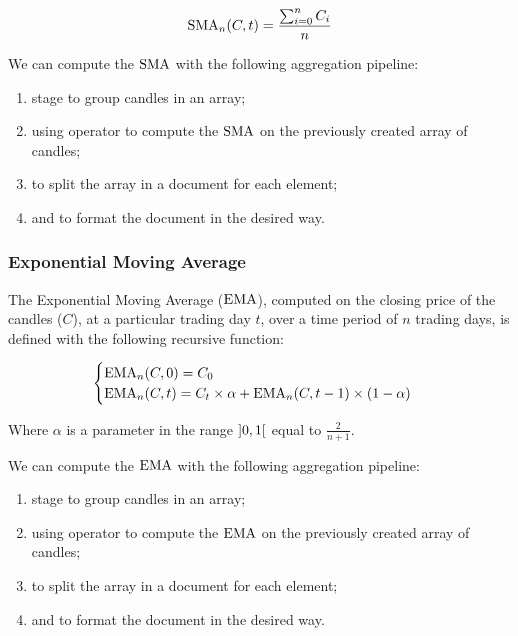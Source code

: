 \begin{equation}\label{eq:sma}
	\operatorname{SMA}_n(C,t) = \frac{\sum_{i = 0}^n C_i}{n}
\end{equation}

We can compute the \(\operatorname{SMA}\) with the following aggregation pipeline:

\begin{enumerate}
	\item {} stage to group candles in an array;
	\item {} using  operator to compute the
		\(\operatorname{SMA}\) on the previously created array of candles;
	\item {} to split the array in a document for each element;
	\item {} and  to format the document
		in the desired way.
\end{enumerate}

\subsubsection{Exponential Moving Average}

The Exponential Moving Average (\(\operatorname{EMA}\)), computed on the closing price of the
candles (\(C\)), at a particular trading day \(t\), over a time period of \(n\)
trading days, is defined with the following recursive function:

\begin{equation}\label{eq:ema}
	\begin{cases}
		\operatorname{EMA}_n(C,0) = C_0\\
		\operatorname{EMA}_n(C,t) = C_t\times\alpha +
		\operatorname{EMA}_n(C,t-1)\times(1-\alpha)
	\end{cases}
\end{equation}

Where \(\alpha\) is a parameter in the range \(\interval[open]{0}{1}\)
equal to \(\frac{2}{n + 1}\).

We can compute the \(\operatorname{EMA}\) with the following aggregation pipeline:

\begin{enumerate}
	\item {} stage to group candles in an array;
	\item {} using  operator to compute the
		\(\operatorname{EMA}\) on the previously created array of candles;
	\item {} to split the array in a document for each element;
	\item {} and  to format the document
		in the desired way.
\end{enumerate}

